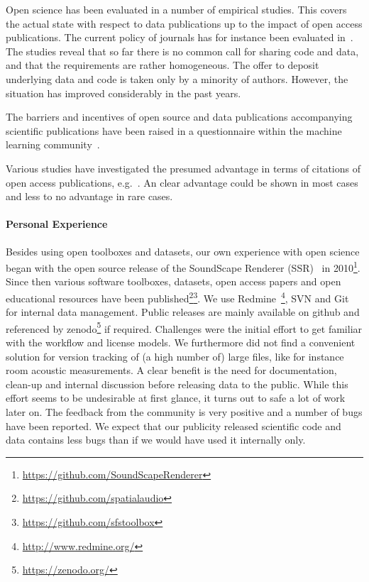 \documentclass[a4paper, 10pt, twocolumn]{article}
\begin{document}
Open science has been evaluated in a number of empirical studies. This covers the
actual state with respect to data publications up to the impact of open access 
publications. The current policy of journals has for instance been evaluated in~\cite{Stodden2013:PLOS1,Alsheikh11:PLOS}. The studies reveal that so far there is 
no common call for sharing code and data, and that the requirements are rather 
homogeneous. The offer to deposit underlying data and code is taken only by a minority
of authors. However, the situation has improved considerably in the past years.

The barriers and incentives of open source and data publications accompanying 
scientific publications have been raised in a questionnaire within the machine 
learning community~\cite{}.

Various studies have investigated the presumed advantage in terms of citations of
open access publications, e.g.~\cite{Swan10:study,McCabe14:EI}. An clear advantage 
could be shown in most cases and less to no advantage in rare cases.


\paragraph*{Personal Experience}

Besides using open toolboxes and datasets, our own experience with open science began 
with the open source release of the SoundScape Renderer (SSR)~\cite{Geier07:DEGA} in 
2010\footnote{\url{https://github.com/SoundScapeRenderer}}. Since then various software toolboxes, 
datasets, open access papers and open educational resources have been 
published\footnote{\url{https://github.com/spatialaudio}}\footnote{\url{https://github.com/sfstoolbox}}. 
We use Redmine~\footnote{\url{http://www.redmine.org/}}, SVN and Git for internal data management. Public releases are mainly
available on github and referenced by zenodo\footnote{\url{https://zenodo.org/}} if required. Challenges were the initial
effort to get familiar with the workflow and license models. We furthermore did not find
a convenient solution for version tracking of (a high number of) large files, like for instance room 
acoustic measurements. A clear benefit is the need for documentation, clean-up and internal
discussion before releasing data to the public. While this effort seems to be undesirable at
first glance, it turns out to safe a lot of work later on. The feedback from the community
is very positive and a number of bugs have been reported. We expect that our publicity 
released scientific code and data contains less bugs than if we would have used it 
internally only. 
\end{document}
